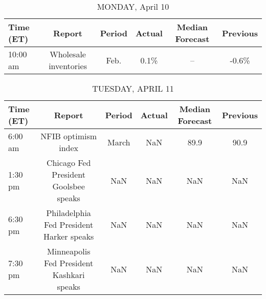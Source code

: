 \documentclass{article}%
\begin{document}
%
\normalsize%


\begin{table}[htbp]%
\caption{MONDAY, April 10}%
\centering%
\begin{adjustbox}{width=1\textwidth}%
\begin{tabular}{lccccc}
\toprule
Time (ET) &                Report & Period & Actual & Median Forecast & Previous \\
\midrule
 10:00 am & Wholesale inventories &   Feb. &   0.1\% &              -- &    -0.6\% \\
\bottomrule
\end{tabular}
%
\end{adjustbox}%
\end{table}

%


\begin{table}[htbp]%
\caption{TUESDAY, APRIL 11}%
\centering%
\begin{adjustbox}{width=1\textwidth}%
\begin{tabular}{lccccc}
\toprule
Time (ET) &                                    Report & Period & Actual & Median Forecast & Previous \\
\midrule
  6:00 am &                       NFIB optimism index &  March &    NaN &            89.9 &     90.9 \\
  1:30 pm &     Chicago Fed President Goolsbee speaks &    NaN &    NaN &             NaN &      NaN \\
  6:30 pm &  Philadelphia Fed President Harker speaks &    NaN &    NaN &             NaN &      NaN \\
  7:30 pm & Minneapolis Fed President Kashkari speaks &    NaN &    NaN &             NaN &      NaN \\
\bottomrule
\end{tabular}
%
\end{adjustbox}%
\end{table}

%
\end{document}
